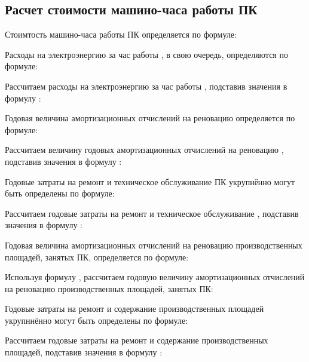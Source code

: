 \subsection{Расчет стоимости машино-часа работы ПК}
\label{sec:economics:cpuclocktime}

Стоимтость машино-часа работы ПК определяется по формуле:
\pcHourCostEquation

Расходы на электроэнергию за час работы \pc, в свою очередь, определяются по формуле:
\energyHourCostEquation

Рассчитаем расходы на электроэнергию за час работы \pc, подставив значения в формулу :
\energyHourCostFormulaApplied

Годовая величина амортизационных отчислений на реновацию \pc определяется по формуле:
\pcAmortizationCostEquation

Рассчитаем величину годовых амортизационных отчислений на реновацию \pc, подставив значения в формулу :
\pcAmortizationCostFormulaApplied

Годовые затраты на ремонт и техническое обслуживание ПК укрупнённо могут быть определены по формуле:
\pcSupportCostEquation

Рассчитаем годовые затраты на ремонт и техническое обслуживание \pc, подставив значения в формулу :
\pcSupportCostFormulaApplied

Годовая величина амортизационных отчислений на реновацию производственных площадей, занятых ПК, определяется по формуле:
\devPlaceAmortizationCostEquation

Используя формулу , рассчитаем годовую величину амортизационных отчислений на реновацию производственных площадей, занятых ПК:
\devPlaceAmortizationCostFormulaApplied

Годовые затраты на ремонт и содержание производственных площадей укрупннённо могут быть определены по формуле:
\devPlaceSupportCostEquation

Рассчитаем годовые затраты на ремонт и содержание производственных площадей, подставив значения в формулу :
\devPlaceSupportCostFormulaApplied